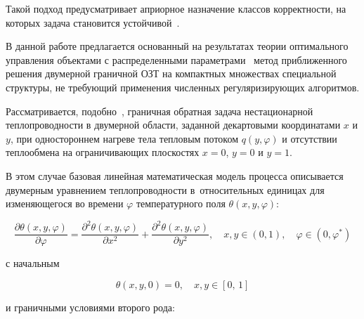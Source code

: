 Такой подход предусматривает априорное назначение классов корректности, на которых задача становится устойчивой~\cite{ulg:bib:Ivanov, ulg:bib:Tikhonov}.



В данной работе предлагается основанный на результатах теории оптимального управления объектами с распределенными параметрами~\cite{ulg:bib:Butkovskiy} метод приближенного решения двумерной граничной ОЗТ на компактных множествах специальной структуры, не требующий применения численных регуляризирующих алгоритмов. 



\smallskip




Рассматривается, подобно~\cite{ulg:bib:Kuzin_2_D, ulg:bib:Alifanov_OZT, ulg:bib:Reinhardt}, граничная обратная задача нестационарной теплопроводности в двумерной области, заданной декартовыми координатами $x$ и $y$, при одностороннем нагреве тела тепловым потоком $q(y,\varphi)$ и отсутствии теплообмена на ограничивающих плоскостях $x=0$, $y=0$ и $y=1$.

В этом случае базовая линейная математическая модель процесса описывается двумерным уравнением теплопроводности в~относительных единицах для изменяющегося во времени $\varphi $ температурного поля $\theta (x,y,\varphi )$:

\begin{equation}\label{eq:ulg:GeneralModel1}

\frac{\partial \theta (x,y,\varphi )}{\partial \varphi } = \frac{{\partial ^2}\theta (x,y,\varphi )}{\partial {x^2}} + \frac{{\partial ^2}\theta (x,y,\varphi )}{\partial {y^2}},

\quad 

 x, y \in ( 0, 1  ), \quad \varphi  \in ( 0,\varphi ^* )

\end{equation}

с начальным 

\begin{equation}\label{eq:ulg:BoundaryCondition2}

\theta (x,y,0) = 0,\quad x,y \in [0,\,1]

\end{equation}

и граничными условиями второго рода:

